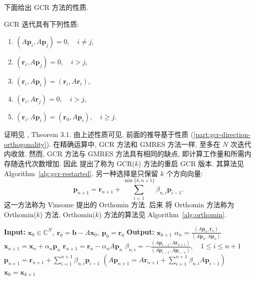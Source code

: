 {下面给出 GCR 方法的性质.}
\par{}
\begin{Proposition}\label{prop:gcr-orthogonality}
{GCR 迭代具有下列性质:}
\begin{enumerate}[label=(G\arabic*),ref=G\arabic*]
\item\label{part:gcr-direction-orthogonality} $(A\bm p_i,A\bm p_j)=0,\quad i\ne j$,
\item $(\bm r_i,A\bm p_j)=0,\quad i>j$,
\item $(\bm r_i,A\bm p_i)=(\bm r_i,A\bm r_i)$,
\item $(\bm r_i,A\bm r_j)=0,\quad i>j$,
\item $(\bm r_i,A\bm p_i)=(\bm r_0,A\bm p_i),\quad i\ge j$.
\end{enumerate}\end{Proposition}
{证明见 , Theorem 3.1.}
{由上述性质可见, 前面的推导基于性质 (\ref{part:gcr-direction-orthogonality}). 在精确运算中, GCR 方法和 GMRES 方法一样, 至多在 $N$ 次迭代内收敛. 然而, GCR 方法与 GMRES 方法具有相同的缺点, 即计算工作量和所需内存随迭代次数增加. 因此  提出了称为 GCR($k$) 方法的重启 GCR 版本. 其算法见 Algorithm\ \ref{alg:gcr-restarted}.}
{另一种选择是只保留 $k$ 个方向向量:}
\[\bm p_{n+1}=\bm r_{n+1}+\sum_{i=1}^{\min\{k,n+1\}}\beta_{n,i}\bm p_{i-1}.\]
{这一方法称为 Vinsome  提出的 Orthomin 方法. 后来  将 Orthomin 方法称为 \linebreak[4]Orthomin($k$) 方法. Orthomin($k$) 方法的算法见 Algorithm\ \ref{alg:orthomin}.}
\begin{algorithm}[H]\caption{{GCR($k$) 方法}}\label{alg:gcr-restarted}\begin{algorithmic}[1]
\Statex\textbf{Input:} $\bm x_0\in\mathbb C^N,\ \bm r_0=\bm b-A\bm x_0,\ \bm p_0=\bm r_0$
\Statex\textbf{Output:} $\bm x_{k+1}$
\State $\alpha_n=\frac{(A\bm p_n,\bm r_n)}{(A\bm p_n,A\bm p_n)}$
\State $\bm x_{n+1}=\bm x_n+\alpha_n\bm p_n$
\State $\bm r_{n+1}=\bm r_n-\alpha_nA\bm p_n$
\State $\beta_{n,i}=-\frac{(A\bm p_{i-1},A\bm r_{n+1})}{(A\bm p_{i-1},A\bm p_{i-1})},\quad1\le i\le n+1$
\State $\bm p_{n+1}=\bm r_{n+1}+\sum_{i=1}^{n+1}\beta_{n,i}\bm p_{i-1}$
\State $(A\bm p_{n+1}=A\bm r_{n+1}+\sum_{i=1}^{n+1}\beta_{n,i}A\bm p_{i-1})$
\EndFor\State $\bm x_0=\bm x_{k+1}$
\end{algorithmic}\end{algorithm}
